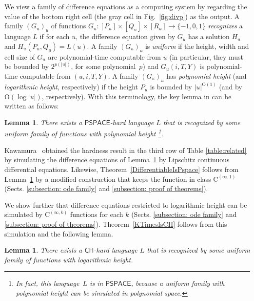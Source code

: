\documentclass{lmcs}
\newtheorem{lemma}[theorem]{Lemma}
\theoremstyle{definition}
\theoremstyle{remark}
\newcommand{\classPSPACE}{\mathsf{PSPACE}}
\newcommand{\classCH}{\mathsf{CH}}
\newcommand{\classC}{\mathrm C}
\begin{document}
We view a family of difference equations as a computing system by
regarding the value of the bottom right cell (the gray cell in Fig.~\ref{fig:divp}) as the output. 
A family $(G_u)_u$ of functions 
$G_u \colon [P_u] \times [Q_u] \times [R_u] \to \{-1, 0, 1\}$
\emph{recognizes} a language $L$ if for each $u$,
the difference equation given by $G_u$ has a solution $H_u$ 
and $H_u(P_u, Q_u) = L(u)$.
A family $(G_u)_u$ is \emph{uniform} 
if the height, width and cell size of $G_u$ are 
polynomial-time computable from $u$ (in particular, 
they must be bounded by $2^{p(|u|)}$, for some polynomial~$p$)
and $G_u(i, T, Y)$ is polynomial-time computable from $(u, i, T, Y)$.
A family $(G_u)_u$ has \emph{polynomial height} 
(and \emph{logarithmic height}, respectively)
if the height $P_u$ is bounded by $|u| ^{\mathrm O (1)}$
(and by $\mathrm O (\log |u|)$, respectively).
With this terminology,
the key lemma in 
\cite[Lemma 4.7]{kawamura2010lipschitz} 
can be written as follows:
\begin{lemma}
 \label{DIVPpolyIsPSPACEhard}
 There exists a $\classPSPACE$-hard language $L$ that is recognized by some uniform family of functions with polynomial height%
 \footnote{In fact, 
this language~$L$ is in $\classPSPACE$, 
because a uniform family with polynomial height 
can be simulated in polynomial space.
}.
\end{lemma}

Kawamura~\cite{kawamura2010lipschitz} obtained the hardness result in the third row of Table \ref{table:related} 
by simulating the difference equations of Lemma~\ref{DIVPpolyIsPSPACEhard}
by Lipschitz continuous differential equations. 
Likewise, 
Theorem~\ref{DifferentiableIsPspace} follows from Lemma~\ref{DIVPpolyIsPSPACEhard}
by a modified construction that keeps 
the function in class $\classC ^{(\infty, 1)}$ 
(Sects. \ref{subsection: ode family} and \ref{subsection: proof of theorems}).

We show further that 
difference equations restricted to logarithmic height can be simulated by
$\classC ^{(\infty, k)}$ functions for each $k$ 
(Sects. \ref{subsection: ode family} and \ref{subsection: proof of theorems}).
Theorem~\ref{KTimesIsCH} follows from this simulation and the following lemma.
\begin{lemma}
 \label{DIVPlogIsCHhard}
 There exists a $\classCH$-hard language $L$ that is recognized by some uniform family of functions with logarithmic height.
\end{lemma}
\end{document}
